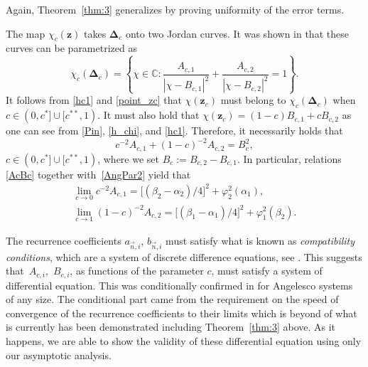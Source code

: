 \documentclass[10pt,a4paper]{amsart}
\numberwithin{equation}{section}
\newcommand{\C}		{\mathbb{C}}
\newcommand{\n}{{\vec n}}
\newcommand{\z}	{{\boldsymbol z}}
\begin{document}
Again, Theorem~\ref{thm:3} generalizes \cite[Theorem~1.2]{ApDenYa21} by proving uniformity of the error terms.

The map $ \chi_c(\z) $ takes $ \boldsymbol\Delta_c $ onto two Jordan curves. It was shown in \cite[Lemma~4.1.2]{DenYa22} that these curves can be parametrized as
\begin{equation}
\label{chi_curves}
\chi_c(\boldsymbol\Delta_c) = \left\{ \chi\in\C : \frac{A_{c,1}}{|\chi-B_{c,1}|^2} + \frac{A_{c,2}}{|\chi-B_{c,2}|^2} = 1 \right\}.
\end{equation}
It follows from \eqref{hc1} and \eqref{point_zc} that $ \chi(\z_c) $ must belong to $ \chi_c(\boldsymbol\Delta_c) $ when $ c\in(0,c^*]\cup[c^{**},1) $. It must also hold that $ \chi(\z_c)=(1-c)B_{c,1} + cB_{c,2} $ as one can see from \eqref{Pin}, \eqref{h_chi}, and \eqref{hc1}. Therefore, it necessarily holds that
\begin{equation}
\label{AcBc}
c^{-2}A_{c,1} + (1-c)^{-2}A_{c,2} = B_c^2,
\end{equation}
$ c\in(0,c^*]\cup[c^{**},1) $, where we set $ B_c := B_{c,2}-B_{c,1} $. In particular, relations \eqref{AcBc} together with~\eqref{AngPar2} yield that
\begin{gather}
\lim_{c\to0} c^{-2} A_{c,1} = \big[(\beta_2-\alpha_2)/4\big]^2 + \varphi_2^2(\alpha_1),\nonumber \\
\lim_{c\to1} (1-c)^{-2} A_{c,2} = \big[(\beta_1-\alpha_1)/4\big]^2 + \varphi_1^2(\beta_2).\label{c_vanish}
\end{gather}

The recurrence coefficients $ a_{\n,i}$, $b_{\n,i} $ must satisfy what is known as \emph{compatibility conditions}, which are a system of discrete difference equations, see \cite[Theorem~3.2]{VA11}. This suggests that~$ A_{c,i}$,~$B_{c,i} $, as functions of the parameter $ c $, must satisfy a system of differential equation. This was conditionally confirmed in \cite[Theorem~3]{ApKoz20} for Angelesco systems of any size. The conditional part came from the requirement on the speed of convergence of the recurrence coefficients to their limits which is beyond of what is currently has been demonstrated including Theorem~\ref{thm:3} above. As it happens, we are able to show the validity of these differential equation using only our asymptotic analysis.
\end{document}
